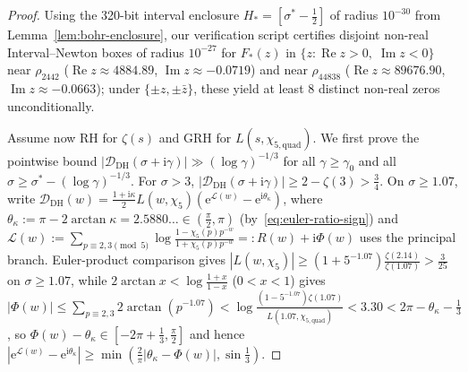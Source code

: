 \documentclass[11pt,a4paper,reqno]{amsart}
\theoremstyle{definition}
\theoremstyle{remark}
\numberwithin{equation}{section}
\newcommand{\ii}{\mathrm{i}}
\newcommand{\ee}{\mathrm{e}}
\DeclareMathOperator{\Reop}{Re}
\DeclareMathOperator{\Imop}{Im}
\begin{document}
\begin{proof}
Using the 320-bit interval enclosure $H_* = [\sigma^* - \frac{1}{2}]$ of radius $10^{-30}$ from Lemma~\ref{lem:bohr-enclosure}, our verification script certifies disjoint non-real Interval--Newton boxes of radius $10^{-27}$ for $F_*(z)$ in $\{z : \Reop z > 0,\; \Imop z < 0\}$ near $\rho_{2442}$ ($\Reop z \approx 4884.89$, $\Imop z \approx -0.0719$) and near $\rho_{44838}$ ($\Reop z \approx 89676.90$, $\Imop z \approx -0.0663$); under $\{\pm z, \pm\bar{z}\}$, these yield at least $8$ distinct non-real zeros unconditionally.

Assume now RH for $\zeta(s)$ and GRH for $L(s, \chi_{5,\mathrm{quad}})$. We first prove the pointwise bound $|\mathcal{D}_{\mathrm{DH}}(\sigma + \ii\gamma)| \gg (\log\gamma)^{-1/3}$ for all $\gamma \ge \gamma_0$ and all $\sigma \ge \sigma^* - (\log\gamma)^{-1/3}$. For $\sigma > 3$, $|\mathcal{D}_{\mathrm{DH}}(\sigma + \ii\gamma)| \ge 2 - \zeta(3) > \frac{3}{4}$. On $\sigma \ge 1.07$, write $\mathcal{D}_{\mathrm{DH}}(w) = \frac{1 + \ii\kappa}{2}L(w,\chi_5)(\ee^{\mathcal{L}(w)} - \ee^{\ii\theta_\kappa})$, where $\theta_\kappa := \pi - 2\arctan\kappa = 2.5880\ldots \in (\frac{\pi}{2}, \pi)$ (by~\eqref{eq:euler-ratio-sign}) and $\mathcal{L}(w) := \sum_{p \equiv 2,3 \pmod{5}}\log\frac{1 - \chi_5(p)p^{-w}}{1 + \chi_5(p)p^{-w}} =: R(w) + \ii\Phi(w)$ uses the principal branch. Euler-product comparison gives $|L(w,\chi_5)| \ge (1 + 5^{-1.07})\frac{\zeta(2.14)}{\zeta(1.07)} > \frac{3}{25}$ on $\sigma \ge 1.07$, while $2\arctan x < \log\frac{1+x}{1-x}$ ($0 < x < 1$) gives $|\Phi(w)| \le \sum_{p \equiv 2,3} 2\arctan(p^{-1.07}) < \log\frac{(1 - 5^{-1.07})\zeta(1.07)}{L(1.07,\chi_{5,\mathrm{quad}})} < 3.30 < 2\pi - \theta_\kappa - \frac{1}{3}$, so $\Phi(w) - \theta_\kappa \in [-2\pi + \frac{1}{3}, \frac{\pi}{2}]$ and hence $|\ee^{\mathcal{L}(w)} - \ee^{\ii\theta_\kappa}| \ge \min(\frac{2}{\pi}|\theta_\kappa - \Phi(w)|, \sin\frac{1}{3})$.


\end{proof}
\end{document}
